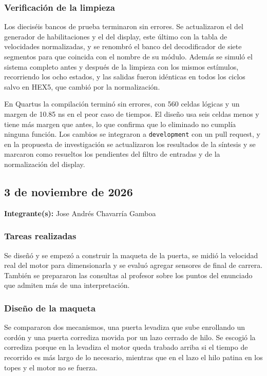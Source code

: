 \documentclass[11pt,letterpaper]{article}
\newcommand{\entrada}[2]{%
  \subsection*{#1}%
  \addcontentsline{toc}{subsection}{#1}%
  \noindent\textbf{Integrante(s):} #2\par\medskip
}
\begin{document}
\subsubsection*{Verificación de la limpieza}

Los dieciséis bancos de prueba terminaron sin errores. Se actualizaron el del generador de habilitaciones y el del display, este último con la tabla de velocidades normalizadas, y se renombró el banco del decodificador de siete segmentos para que coincida con el nombre de su módulo. Además se simuló el sistema completo antes y después de la limpieza con los mismos estímulos, recorriendo los ocho estados, y las salidas fueron idénticas en todos los ciclos salvo en HEX5, que cambió por la normalización.

En Quartus la compilación terminó sin errores, con 560 celdas lógicas y un margen de 10.85 ns en el peor caso de tiempos. El diseño usa seis celdas menos y tiene más margen que antes, lo que confirma que lo eliminado no cumplía ninguna función. Los cambios se integraron a \texttt{development} con un pull request, y en la propuesta de investigación se actualizaron los resultados de la síntesis y se marcaron como resueltos los pendientes del filtro de entradas y de la normalización del display.


\entrada{3 de noviembre de 2026}{Jose Andrés Chavarría Gamboa}

\subsubsection*{Tareas realizadas}

Se diseñó y se empezó a construir la maqueta de la puerta, se midió la velocidad real del motor para dimensionarla y se evaluó agregar sensores de final de carrera. También se prepararon las consultas al profesor sobre los puntos del enunciado que admiten más de una interpretación.

\subsubsection*{Diseño de la maqueta}

Se compararon dos mecanismos, una puerta levadiza que sube enrollando un cordón y una puerta corrediza movida por un lazo cerrado de hilo. Se escogió la corrediza porque en la levadiza el motor queda trabado arriba si el tiempo de recorrido es más largo de lo necesario, mientras que en el lazo el hilo patina en los topes y el motor no se fuerza.
\end{document}
